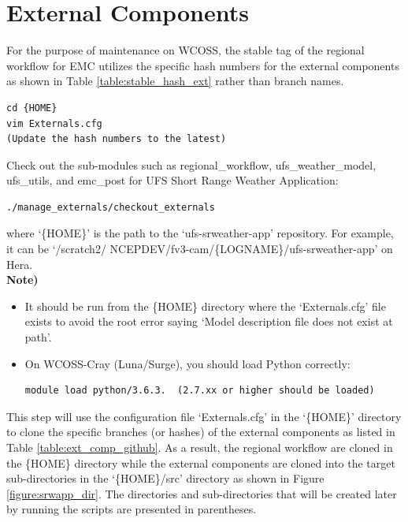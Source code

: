 \documentclass[11pt,fleqn]{report}              %
\begin{document}
\section{External Components}
\label{sec:pre_work_ext}

For the purpose of maintenance on WCOSS, the stable tag of the regional workflow for EMC utilizes the specific hash numbers for the external components as shown in Table \ref{table:stable_hash_ext} rather than branch names.
\lstset{language=bash}   
\begin{lstlisting}[frame=trBL]
cd {HOME}
vim Externals.cfg
(Update the hash numbers to the latest)
\end{lstlisting}

Check out the sub-modules such as regional\_workflow, ufs\_weather\_model, ufs\_utils, and emc\_post for UFS Short Range Weather Application:
\lstset{language=bash}   
\begin{lstlisting}[frame=trBL]
./manage_externals/checkout_externals
\end{lstlisting}
where `\{HOME\}' is the path to the `ufs-srweather-app' repository. For example, it can be `/scratch2/ NCEPDEV/fv3-cam/\{LOGNAME\}/ufs-srweather-app' on Hera. \\

{\bf Note)} 
\begin{itemize}
\item It should be run from the \{HOME\} directory where the `Externals.cfg' file exists to avoid the root error saying `Model description file does not exist at path'.
\item On WCOSS-Cray (Luna/Surge), you should load Python correctly:
\lstset{language=bash}   
\begin{lstlisting}[frame=trBL]
module load python/3.6.3.  (2.7.xx or higher should be loaded)
\end{lstlisting}
\end{itemize}

This step will use the configuration file `Externals.cfg' in the `\{HOME\}' directory to clone the specific branches (or hashes) of the external components as listed in Table \ref{table:ext_comp_github}. As a result, the regional workflow are cloned in the \{HOME\} directory while the external components are cloned into the target sub-directories in the `\{HOME\}/src' directory as shown in Figure \ref{figure:srwapp_dir}. The directories and sub-directories that will be created later by running the scripts are presented in parentheses. 
\end{document}
